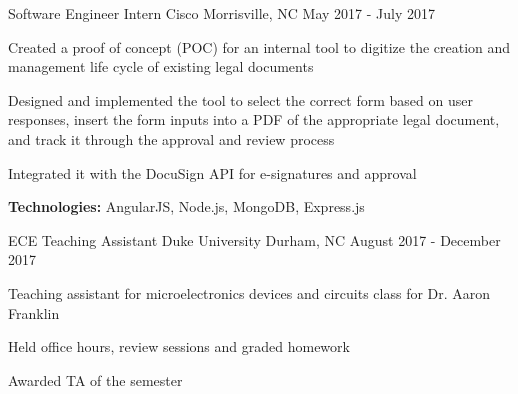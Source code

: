 \begin{cventries}
  \cventry
    {Software Engineer Intern} %
    {Cisco} %
    {Morrisville, NC} %
    {May 2017 - July 2017} %
    {
      \begin{cvitems} %
        \item{Created a proof of concept (POC) for an internal tool to digitize the creation and management life cycle of existing legal documents}
        \item{Designed and implemented the tool to select the correct form based on user responses, insert the form inputs into a PDF of the appropriate legal document, and track it through the approval and review process}
        \item{Integrated it with the DocuSign API for e-signatures and approval}
        {\setlength \itemindent{-2ex} \itemsep2pt \item[] \textbf{Technologies:} AngularJS, Node.js, MongoDB, Express.js}
      \end{cvitems}
    }
    
    \cventry
    {ECE Teaching Assistant} %
    {Duke University} %
    {Durham, NC} %
    {August 2017 - December 2017} %
    {
      \begin{cvitems} %
        \item{Teaching assistant for microelectronics devices and circuits class for Dr. Aaron Franklin}
        \item{Held office hours, review sessions and graded homework}
        \item{Awarded TA of the semester}
      \end{cvitems}
    }
\end{cventries}
